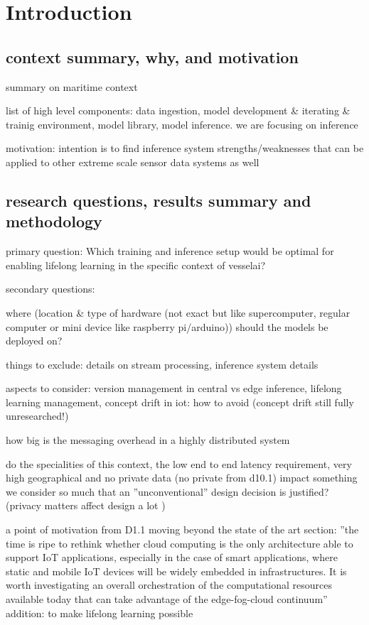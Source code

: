 \chapter{Introduction}

\section{context summary, why, and motivation}
summary on maritime context

list of high level components: data ingestion, model development & iterating & trainig environment, model library, model inference. we are focusing on inference

motivation: intention is to find inference system strengths/weaknesses that can be applied to other extreme scale sensor data systems as well

\section{research questions, results summary and methodology}

primary question: Which training and inference setup would be optimal for enabling lifelong learning in the specific context of vesselai?

secondary questions:

where (location & type of hardware (not exact but like supercomputer, regular computer or mini device like raspberry pi/arduino)) should the models be deployed on?

things to exclude: details on stream processing, inference system details

aspects to consider: version management in central vs edge inference, lifelong learning management, concept drift in iot: how to avoid (concept drift still fully unresearched!)

how big is the messaging overhead in a highly distributed system

do the specialities of this context, the low end to end latency requirement, very high geographical and no private data (no private from d10.1) impact something we consider so much that an ''unconventional'' design decision is justified? (privacy matters affect design a lot \cite{iotsystems})

a point of motivation from D1.1 moving beyond the state of the art section: ''the time is ripe  to  rethink  whether  cloud  computing  is  the  only  architecture  able  to  support  IoT  applications, especially  in  the  case  of  smart applications,  where  static  and  mobile  IoT  devices  will  be  widely embedded  in  infrastructures.  It  is  worth  investigating  an  overall  orchestration  of  the  computational resources  available  today  that  can  take  advantage  of  the  edge-fog-cloud  continuum'' addition: to make lifelong learning possible

